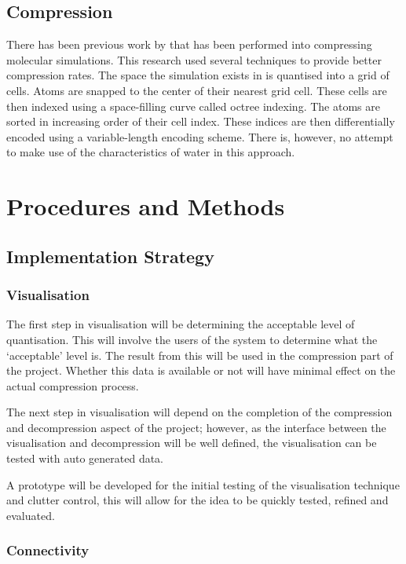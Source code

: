\documentclass[a4paper,twocolumn]{article}
\begin{document}
\subsection{Compression}

There has been previous work by \citep{omeltchenko2000sls} that has been
performed into compressing molecular simulations. This research used several
techniques to provide better compression rates. The space the simulation
exists in is quantised into a grid of cells. Atoms are snapped to the center
of their nearest grid cell. These cells are then indexed using a space-filling
curve called octree indexing. The atoms are sorted in increasing order of
their cell index. These indices are then differentially encoded using a
variable-length encoding scheme. There is, however, no attempt to make use of
the characteristics of water in this approach.



\section{Procedures and Methods}

\subsection{Implementation Strategy}

\subsubsection*{Visualisation}

The first step in visualisation will be determining the acceptable level of
quantisation. This will involve the users of the system to determine what the
`acceptable' level is. The result from this will be used in the compression
part of the project. Whether this data is available or not will have minimal
effect on the actual compression process.

The next step in visualisation will depend on the completion of the
compression and decompression aspect of the project; however, as the interface
between the visualisation and decompression will be well defined, the
visualisation can be tested with auto generated data.

A prototype will be developed for the initial testing of the visualisation
technique and clutter control, this will allow for the idea to be quickly
tested, refined and evaluated.

\subsubsection*{Connectivity}
\end{document}
